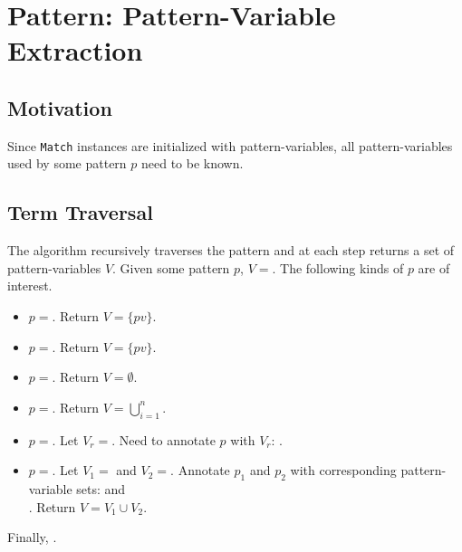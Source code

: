 \section{Pattern: Pattern-Variable Extraction}
\label{section:pv-extraction}

\subsection{Motivation}
Since \texttt{Match} instances are initialized with pattern-variables, all pattern-variables used by some pattern $p$ need to be known. 

\subsection{Term Traversal}
The algorithm recursively traverses the pattern and at each step returns a set of pattern-variables $V$. Given some pattern $p$, $V=$\space {}. The following kinds of $p$ are of interest.

\begin{itemize}
\item $p=$\space \NonTerminal. Return $V = \{ pv \}$.
\item $p=$\space \BuiltInPattern. Return $V=\{ pv \}$.
\item $p=$\space \LiteralPattern. Return $V=\emptyset$.
\item $p=$\space \PatternSequence. Return $V=\bigcup_{i=1}^{n}$.
\item $p=$\space \PatternRepeat. Let $V_r=$. Need to annotate $p$ with $V_r$: .
\item $p=$\space \PatternInHole. Let $V_1=$ and  $V_2=$. Annotate $p_1$ and $p_2$ with corresponding pattern-variable sets:  and \\ . Return $V = V_1 \cup V_2$.
\end{itemize}

Finally, .

